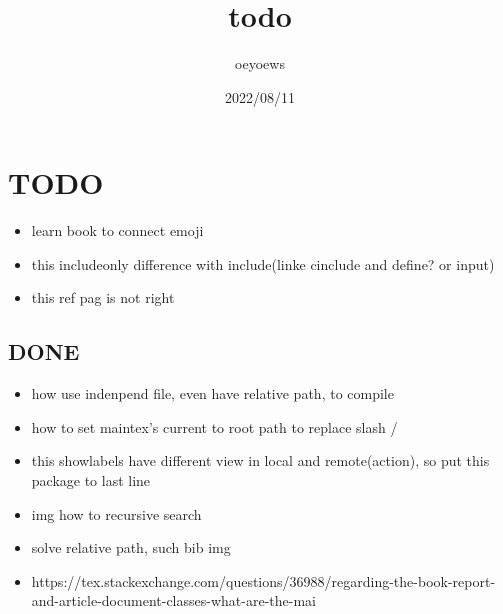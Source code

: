 \documentclass[UTF8]{article}
\title{todo \emoji{check-mark-button}}
\author{oeyoews}
\date{2022/08/11}
\begin{document}
\maketitle

\section{ TODO }%
\label{sec:TODO}

\begin{itemize}
  \item learn book to connect emoji
	\item this includeonly difference with include(linke cinclude and define? or
	      input)
	\item this ref pag is not right
\end{itemize}

\subsection{DONE}%
\label{sec:DONE}

\begin{itemize}
	\item how use indenpend file, even have relative path, to compile
	\item how to set maintex's current to root path to replace slash /
	\item this showlabels have different view in local and remote(action), so put
	      this package to last line
	\item img how to recursive search
	\item solve relative path, such bib img
  \item https://tex.stackexchange.com/questions/36988/regarding-the-book-report-and-article-document-classes-what-are-the-mai
\end{itemize}
\end{document}
